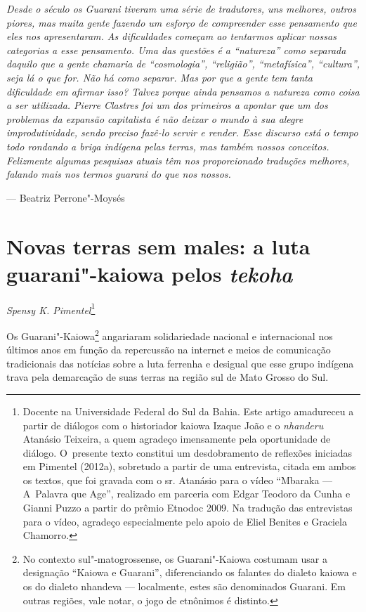 \begin{flushleft}
\begin{minipage}[c]{0.85\textwidth}
\raggedright
\footnotesize
\emph{Desde o século  os Guarani tiveram uma série de tradutores, uns
melhores, outros piores, mas muita gente fazendo um esforço de
compreender esse pensamento que eles nos apresentaram. As dificuldades
começam ao tentarmos aplicar nossas categorias a esse pensamento. Uma
das questões é a ``natureza'' como separada daquilo que a gente chamaria de
``cosmologia'', ``religião'', ``metafísica'', ``cultura'', seja lá o que for. Não há
como separar. Mas por que a gente tem tanta dificuldade em afirmar
isso? Talvez porque ainda pensamos a natureza como coisa a ser
utilizada. Pierre Clastres foi um dos primeiros a apontar que um dos
problemas da expansão capitalista é não deixar o mundo à sua alegre
improdutividade, sendo preciso fazê-lo servir e render. Esse discurso
está o tempo todo rondando a briga indígena pelas terras, mas também
nossos conceitos. Felizmente algumas pesquisas atuais têm nos
proporcionado traduções melhores, falando mais nos termos guarani do
que nos nossos.}

\smallskip
\hspace*{\fill}--- Beatriz Perrone"-Moysés
\end{minipage}
\end{flushleft}

\chapter{Novas terras sem males: a luta guarani"-kaiowa pelos \emph{tekoha}}
\begin{flushright}
\emph{Spensy K. Pimentel}\footnote{Docente na Universidade Federal do Sul da
Bahia. Este artigo amadureceu a partir de diálogos com o historiador
kaiowa Izaque João e o \emph{nhanderu} Atanásio Teixeira, a quem agradeço
imensamente pela oportunidade de diálogo. O~presente texto constitui um
desdobramento de reflexões iniciadas em Pimentel (2012a), sobretudo a
partir de uma entrevista, citada em ambos os textos, que foi gravada
com o sr. Atanásio para o vídeo ``Mbaraka --- A~Palavra que Age'',
realizado em parceria com Edgar Teodoro da Cunha e Gianni Puzzo a
partir do prêmio Etnodoc 2009. Na tradução das entrevistas para o
vídeo, agradeço especialmente pelo apoio de Eliel Benites e Graciela
Chamorro.} 
\end{flushright}

\noindent
Os Guarani"-Kaiowa\footnote{No contexto sul"-matogrossense, os
Guarani"-Kaiowa costumam usar a designação ``Kaiowa e Guarani'',
diferenciando os falantes do dialeto kaiowa e os do dialeto nhandeva ---
localmente, estes são denominados Guarani. Em outras regiões, vale
notar, o jogo de etnônimos é distinto.} angariaram solidariedade
nacional e internacional nos últimos anos em função da repercussão na
internet e meios de comunicação tradicionais das notícias sobre a luta
ferrenha e desigual que esse grupo indígena trava pela demarcação de
suas terras na região sul de Mato Grosso do Sul.

